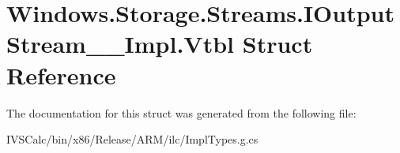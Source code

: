 \hypertarget{struct_windows_1_1_storage_1_1_streams_1_1_i_output_stream_____impl_1_1_vtbl}{}\section{Windows.\+Storage.\+Streams.\+I\+Output\+Stream\+\_\+\+\_\+\+Impl.\+Vtbl Struct Reference}
\label{struct_windows_1_1_storage_1_1_streams_1_1_i_output_stream_____impl_1_1_vtbl}


The documentation for this struct was generated from the following file\+:\begin{DoxyCompactItemize}
\item 
I\+V\+S\+Calc/bin/x86/\+Release/\+A\+R\+M/ilc/Impl\+Types.\+g.\+cs\end{DoxyCompactItemize}
